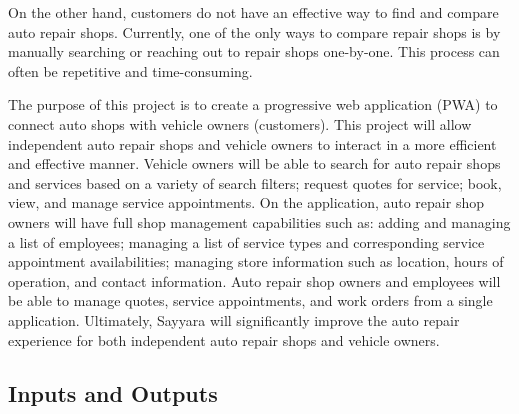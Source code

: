 \documentclass{article}
\begin{document}
On the other hand, customers do not have an effective way to find and compare auto repair shops.
Currently, one of the only ways to compare repair shops is by manually searching or reaching out to
repair shops one-by-one. This process can often be repetitive and time-consuming.

The purpose of this project is to create a progressive web application (PWA) to connect auto shops
with vehicle owners (customers). This project will allow independent auto repair shops and vehicle
owners to interact in a more efficient and effective manner. Vehicle owners will be able to search
for auto repair shops and services based on a variety of search filters; request quotes for
service; book, view, and manage service appointments. On the application, auto repair shop owners
will have full shop management capabilities such as: adding and managing a list of employees;
managing a list of service types and corresponding service appointment availabilities; managing
store information such as location, hours of operation, and contact information. Auto repair shop
owners and employees will be able to manage quotes, service appointments, and work orders from a
single application. Ultimately, Sayyara will significantly improve the auto repair experience for
both independent auto repair shops and vehicle owners.

\subsection{Inputs and Outputs}
\end{document}
